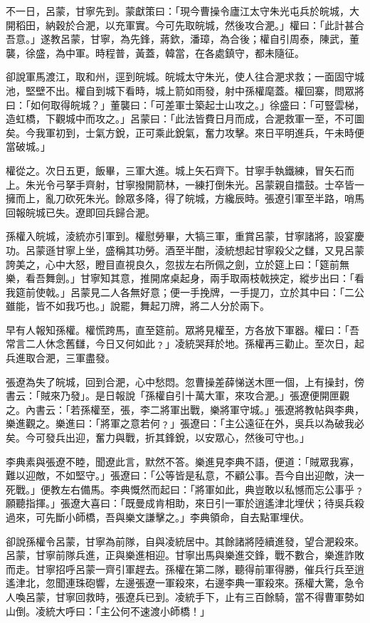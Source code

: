 不一日，呂蒙，甘寧先到。蒙獻策曰：「現今曹操令廬江太守朱光屯兵於皖城，大開稻田，納穀於合淝，以充軍實。今可先取皖城，然後攻合淝。」權曰：「此計甚合吾意。」遂教呂蒙，甘寧，為先鋒，蔣欽，潘璋，為合後；權自引周泰，陳武，董襲，徐盛，為中軍。時程普，黃蓋，韓當，在各處鎮守，都未隨征。

卻說軍馬渡江，取和州，逕到皖城。皖城太守朱光，使人往合淝求救；一面固守城池，堅壁不出。權自到城下看時，城上箭如雨發，射中孫權麾蓋。權回寨，問眾將曰：「如何取得皖城？」董襲曰：「可差軍士築起士山攻之。」徐盛曰：「可豎雲梯，造虹橋，下觀城中而攻之。」呂蒙曰：「此法皆費日月而成，合淝救軍一至，不可圖矣。今我軍初到，士氣方銳，正可乘此銳氣，奮力攻擊。來日平明進兵，午未時便當破城。」

權從之。次日五更，飯畢，三軍大進。城上矢石齊下。甘寧手執鐵練，冒矢石而上。朱光令弓拏手齊射，甘寧撥開箭林，一練打倒朱光。呂蒙親自擂鼓。士卒皆一擁而上，亂刀砍死朱光。餘眾多降，得了皖城，方纔辰時。張遼引軍至半路，哨馬回報皖城已失。遼即回兵歸合淝。

孫權入皖城，淩統亦引軍到。權慰勞畢，大犒三軍，重賞呂蒙，甘寧諸將，設宴慶功。呂蒙遜甘寧上坐，盛稱其功勞。酒至半酣，淩統想起甘寧殺父之讎，又見呂蒙誇美之，心中大怒，瞪目直視良久，忽拔左右所佩之劍，立於筵上曰：「筵前無樂，看吾舞劍。」甘寧知其意，推開席桌起身，兩手取兩枝戟挾定，縱步出曰：「看我筵前使戟。」呂蒙見二人各無好意；便一手挽牌，一手提刀，立於其中曰：「二公雖能，皆不如我巧也。」說罷，舞起刀牌，將二人分於兩下。

早有人報知孫權。權慌跨馬，直至筵前。眾將見權至，方各放下軍器。權曰：「吾常言二人休念舊讎，今日又何如此﹖」凌統哭拜於地。孫權再三勸止。至次日，起兵進取合淝，三軍盡發。

張遼為失了皖城，回到合淝，心中愁悶。忽曹操差薛悌送木匣一個，上有操封，傍書云：「賊來乃發」。是日報說「孫權自引十萬大軍，來攻合淝。」張遼便開匣觀之。內書云：「若孫權至，張，李二將軍出戰，樂將軍守城。」張遼將教帖與李典，樂進觀之。樂進曰：「將軍之意若何﹖」張遼曰：「主公遠征在外，吳兵以為破我必矣。今可發兵出迎，奮力與戰，折其鋒銳，以安眾心，然後可守也。」

李典素與張遼不睦，聞遼此言，默然不答。樂進見李典不語，便道：「賊眾我寡，難以迎敵，不如堅守。」張遼曰：「公等皆是私意，不顧公事。吾今自出迎敵，決一死戰。」便教左右備馬。李典慨然而起曰：「將軍如此，典豈敢以私憾而忘公事乎﹖願聽指揮。」張遼大喜曰：「既曼成肯相助，來日引一軍於逍遙津北埋伏；待吳兵殺過來，可先斷小師橋，吾與樂文謙擊之。」李典領命，自去點軍埋伏。

卻說孫權令呂蒙，甘寧為前隊，自與凌統居中。其餘諸將陸續進發，望合淝殺來。呂蒙，甘寧前隊兵進，正與樂進相迎。甘寧出馬與樂進交鋒，戰不數合，樂進詐敗而走。甘寧招呼呂蒙一齊引軍趕去。孫權在第二隊，聽得前軍得勝，催兵行兵至逍遙津北，忽聞連珠砲響，左邊張遼一軍殺來，右邊李典一軍殺來。孫權大驚，急令人喚呂蒙，甘寧回救時，張遼兵已到。凌統手下，止有三百餘騎，當不得曹軍勢如山倒。凌統大呼曰：「主公何不速渡小師橋！」

